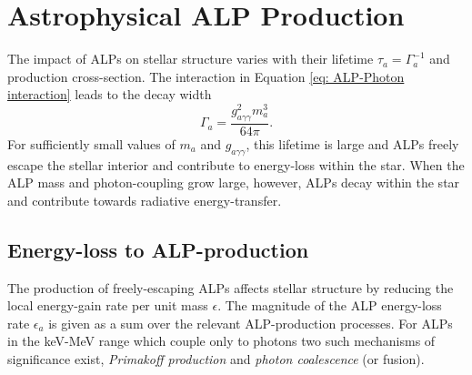\section{Astrophysical ALP Production}
\label{sec: Section 2}



The impact of ALPs on stellar structure varies with their lifetime $\tau_a=\Gamma_a^{-1}$ and production cross-section. The interaction in Equation \ref{eq: ALP-Photon interaction} leads to the decay width
\begin{equation}
    \label{eq: ALP-decay width}
    \Gamma_a=\frac{g_{a\gamma\gamma}^2m_a^3}{64\pi}.
\end{equation}
For sufficiently small values of $m_a$ and $g_{a\gamma\gamma}$, this lifetime is large and ALPs freely escape the stellar interior and contribute to energy-loss within the star. When the ALP mass and photon-coupling grow large, however, ALPs decay within the star and contribute towards radiative energy-transfer.

\subsection{Energy-loss to ALP-production}

The production of freely-escaping ALPs affects stellar structure by reducing the local energy-gain rate per unit mass $\epsilon$. The magnitude of the ALP energy-loss rate $\epsilon_a$ is given as a sum over the relevant ALP-production processes. For ALPs in the keV-MeV range which couple only to photons two such mechanisms of significance exist, \textit{Primakoff production} and \textit{photon coalescence} (or fusion). 



